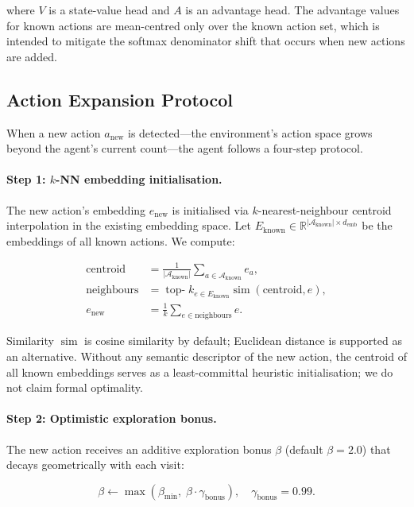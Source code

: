 \documentclass{article}
\begin{document}
where $V$ is a state-value head and $A$ is an advantage head. The advantage
values for known actions are mean-centred only over the known action set,
which is intended to mitigate the softmax denominator shift that occurs when
new actions are added.

\subsection{Action Expansion Protocol}

When a new action $a_\text{new}$ is detected---the environment's action space
grows beyond the agent's current count---the agent follows a four-step
protocol.

\paragraph{Step 1: $k$-NN embedding initialisation.}
The new action's embedding $e_\text{new}$ is initialised via $k$-nearest-neighbour
centroid interpolation in the existing embedding space. Let
$E_\text{known} \in \mathbb{R}^{|\mathcal{A}_\text{known}| \times d_\text{emb}}$
be the embeddings of all known actions. We compute:

\begin{align}
\text{centroid} &= \frac{1}{|\mathcal{A}_\text{known}|}
  \sum_{a \in \mathcal{A}_\text{known}} e_a, \label{eq:centroid} \\
\text{neighbours} &= \operatorname{top-}k_{e \in E_\text{known}}
  \operatorname{sim}(\text{centroid}, e), \label{eq:knn} \\
e_\text{new} &= \frac{1}{k} \sum_{e \in \text{neighbours}} e. \label{eq:new_emb}
\end{align}

Similarity $\operatorname{sim}$ is cosine similarity by default; Euclidean
distance is supported as an alternative. Without any semantic descriptor of
the new action, the centroid of all known embeddings serves as a
least-committal heuristic initialisation; we do not claim formal optimality.

\paragraph{Step 2: Optimistic exploration bonus.}
The new action receives an additive exploration bonus $\beta$ (default
$\beta=2.0$) that decays geometrically with each visit:

\begin{equation}
\beta \leftarrow \max(\beta_\text{min},\;
  \beta \cdot \gamma_\text{bonus}), \quad \gamma_\text{bonus}=0.99.
\end{equation}
\end{document}

